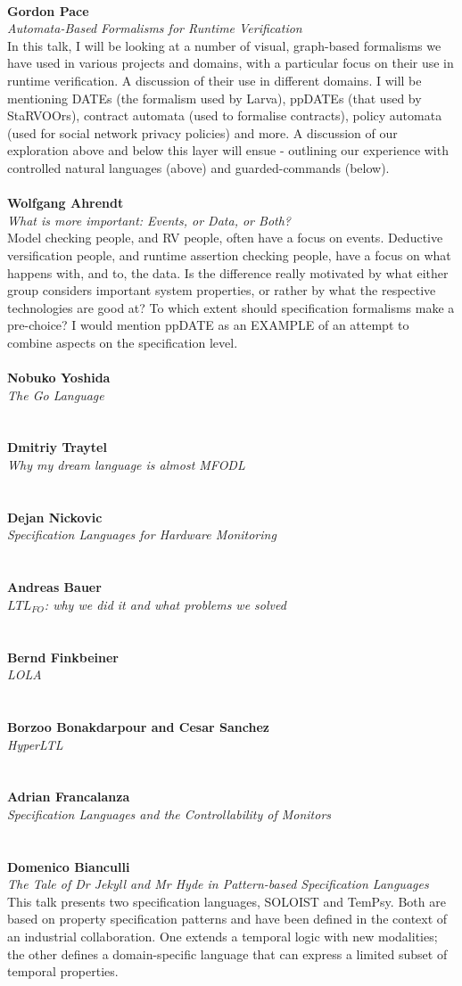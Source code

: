 \documentclass{article}
\newcommand{\talk}[3]{
\vspace{0.5em}~\\
\noindent
\textbf{#1}\\ 
\noindent\emph{#2}\\ 
\noindent#3\\
}
\begin{document}
\talk{Gordon Pace}{Automata-Based Formalisms for Runtime Verification}{In this talk, I will be looking at a number of visual, graph-based formalisms we have used in various projects and domains, with a particular focus on their use in runtime verification. A discussion of their use in different domains. I will be mentioning DATEs (the formalism used by Larva), ppDATEs (that used by StaRVOOrs), contract automata (used to formalise contracts), policy automata (used for social network privacy policies) and more. A discussion of our exploration above and below this layer will ensue - outlining our experience with controlled natural languages (above) and guarded-commands (below).}
\talk{Wolfgang Ahrendt}{What is more important: Events, or Data, or Both?}{Model checking people, and RV people, often have a focus on events. Deductive versification people, and runtime assertion checking people, have a focus on what happens with, and to, the data. Is the difference really motivated by what either group considers important system properties, or rather by what the respective technologies are good at? To which extent should specification formalisms make a pre-choice? I would mention ppDATE as an EXAMPLE of an attempt to combine aspects on the specification level.}
\talk{Nobuko Yoshida}{The Go Language}{}
\talk{Dmitriy Traytel}{Why my dream language is almost MFODL}{}
\talk{Dejan Nickovic}{Specification Languages for Hardware Monitoring}{}
\talk{Andreas Bauer}{$LTL_{FO}$: why we did it and what problems we solved}{}
\talk{Bernd Finkbeiner}{LOLA}{}
\talk{Borzoo Bonakdarpour and Cesar Sanchez}{HyperLTL}{}
\talk{Adrian Francalanza}{Specification Languages and the Controllability of Monitors}{}
\talk{Domenico Bianculli}{The Tale of Dr Jekyll and Mr Hyde in Pattern-based Specification Languages}{This talk presents two specification languages, SOLOIST and TemPsy. Both are based on property specification patterns and have been defined in the context of an industrial collaboration. One extends a temporal logic with new modalities; the other defines a domain-specific language  that can express a limited subset of temporal properties.}
\end{document}
